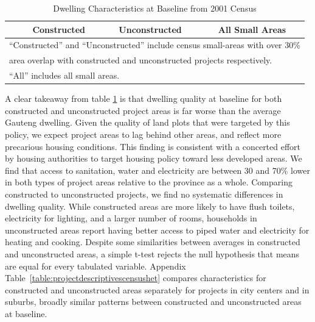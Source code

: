 \documentclass[12pt]{article}
\begin{document}
\begin{table}[h!]
	\centering
	\caption{Dwelling Characteristics at Baseline from 2001 Census}\label{table:projectdescriptivescensus}
\vspace{-2mm}
\begin{tabular}{l*{1}{ccc}}
\toprule
& Constructed & Unconstructed & All Small Areas \\
\midrule
 
\bottomrule
\multicolumn{4}{l}{\scriptsize ``Constructed'' and ``Unconstructed'' include census small-areas with over 30\% } \\ [-.5em]
\multicolumn{4}{l}{\scriptsize  area overlap with constructed and unconstructed projects respectively. } \\ [-.5em]
\multicolumn{4}{l}{\scriptsize ``All''  includes all small areas.}
\end{tabular}
\end{table}



A clear takeaway from table \ref{table:projectdescriptivescensus} is that dwelling quality at baseline for both constructed and unconstructed project areas is far worse than the average Gauteng dwelling. Given the quality of land plots that were targeted by this policy, we expect project areas to lag behind other areas, and reflect more precarious housing conditions.  This finding is consistent with a concerted effort by housing authorities to target housing policy toward less developed areas.  We find that access to sanitation, water and electricity are between 30 and 70\% lower in both types of project areas relative to the province as a whole. Comparing constructed to unconstructed projects, we find no systematic differences in dwelling quality. While constructed areas are more likely to have flush toilets, electricity for lighting, and a larger number of rooms, households in unconstructed areas report having better access to piped water and electricity for heating and cooking. Despite some similarities between averages in constructed and unconstructed areas, a simple t-test rejects the null hypothesis that means are equal for every tabulated variable.  Appendix Table~\ref{table:projectdescriptivescensushet} compares characteristics for constructed and unconstructed areas separately for projects in city centers and in suburbs, broadly similar patterns between constructed and unconstructed areas at baseline.

\end{document}
